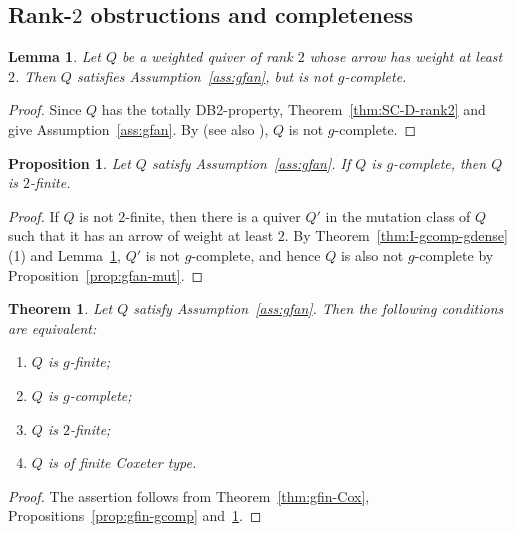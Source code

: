 \documentclass[11pt,reqno]{amsart}
\numberwithin{equation}{section}
\theoremstyle{definition}
\theoremstyle{plain}
\newtheorem{lemma}[example]{Lemma}
\newtheorem{theorem}[example]{Theorem}
\newtheorem{proposition}[example]{Proposition}
\begin{document}
\subsection{Rank-\texorpdfstring{$2$}{2} obstructions and completeness}	
	\begin{lemma}\label{lem:rank2-not-gcomp}
		Let $Q$ be a weighted quiver of rank $2$ whose arrow has weight at least $2$. Then $Q$ satisfies Assumption~\ref{ass:gfan}, but is not $g$-complete.
	\end{lemma}
	
	\begin{proof}
		Since $Q$ has the totally DB2-property, Theorem~\ref{thm:SC-D-rank2} and \cite[Theorem~7.7]{AC25} give Assumption~\ref{ass:gfan}. By \cite[Example~7.8]{AC25} (see also \cite[Proposition~9.6]{Re14}), $Q$ is not $g$-complete.
	\end{proof}
	
	\begin{proposition}\label{prop:gcomp-2fin}
		Let $Q$ satisfy Assumption~\ref{ass:gfan}. If $Q$ is $g$-complete, then $Q$ is $2$-finite.
	\end{proposition}
	
	\begin{proof}
		If $Q$ is not $2$-finite, then there is a quiver $Q'$ in the mutation class of $Q$ such that it has an arrow of weight at least $2$. By Theorem~\ref{thm:I-gcomp-gdense}(1) and Lemma~\ref{lem:rank2-not-gcomp}, $Q'$ is not $g$-complete, and hence $Q$ is also not $g$-complete by Proposition~\ref{prop:gfan-mut}.
	\end{proof}
	
	\begin{theorem}\label{thm:main-classification}
		Let $Q$ satisfy Assumption~\ref{ass:gfan}. Then the following conditions are equivalent:
		\begin{enumerate}[label=\textup{(\arabic*)}]
			\item $Q$ is $g$-finite;
			\item $Q$ is $g$-complete;
			\item $Q$ is $2$-finite;
			\item $Q$ is of finite Coxeter type.
		\end{enumerate}
	\end{theorem}
	
	\begin{proof}
		The assertion follows from Theorem~\ref{thm:gfin-Cox}, Propositions~\ref{prop:gfin-gcomp} and~\ref{prop:gcomp-2fin}.
	\end{proof}
\end{document}

